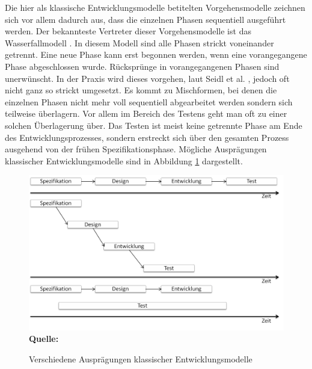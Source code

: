 Die hier als klassische Entwicklungsmodelle betitelten Vorgehensmodelle zeichnen sich vor allem dadurch aus, dass die einzelnen Phasen sequentiell ausgeführt werden. Der bekannteste Vertreter dieser Vorgehensmodelle ist das Wasserfallmodell \cite{royce_managing_1987}. In diesem Modell sind alle Phasen strickt voneinander getrennt. Eine neue Phase kann erst begonnen werden, wenn eine vorangegangene Phase abgeschlossen wurde. Rücksprünge in vorangegangenen Phasen sind unerwünscht. In der Praxis wird dieses vorgehen, laut Seidl et al. \cite[vgl. S.22]{seidl_basiswissen_2012}, jedoch oft nicht ganz so strickt umgesetzt. Es kommt zu Mischformen, bei denen die einzelnen Phasen nicht mehr voll sequentiell abgearbeitet werden sondern sich teilweise überlagern. Vor allem im Bereich des Testens geht man oft zu einer solchen Überlagerung über. Das Testen ist meist keine getrennte Phase am Ende des Entwicklungsprozesses, sondern erstreckt sich über den gesamten Prozess ausgehend von der frühen Spezifikationsphase. Mögliche Ausprägungen klassischer Entwicklungsmodelle sind in Abbildung \ref{fig:verschiedene_auspraegungen_klassischer_entwicklungsmodelle} dargestellt.

\begin{figure}[htb]
  \centering  
  \includegraphics[scale=0.7]{img/sequentielleentwicklungsmodelle.png}\\
  \footnotesize\sffamily\textbf{Quelle:} \cite[vgl. S.22]{seidl_basiswissen_2012}
  \caption{Verschiedene Ausprägungen klassischer Entwicklungsmodelle}
  \label{fig:verschiedene_auspraegungen_klassischer_entwicklungsmodelle}
\end{figure}


